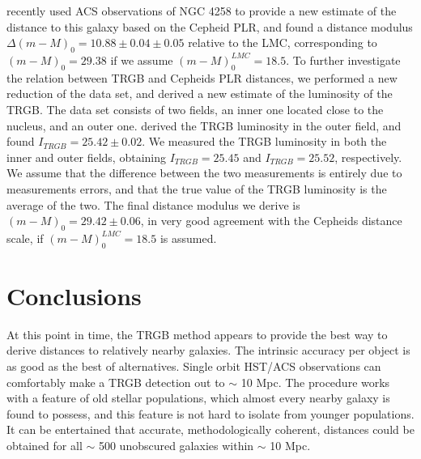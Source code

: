 \documentclass[11pt,preprint2]{aastex}
\begin{document}
\cite{2006astro.ph..8211M} recently used ACS observations of NGC 4258 to provide a new estimate of the distance to this galaxy based on the Cepheid PLR, and found a distance modulus $\Delta(m-M)_0=10.88 \pm 0.04 \pm 0.05$ relative to the LMC, corresponding to $(m-M)_0=29.38$ if we assume $(m-M)_0^{LMC}=18.5$. To further investigate the relation between TRGB and Cepheids PLR distances, we performed a new reduction of the \cite{2006astro.ph..8211M} data set, and derived a new estimate of the luminosity of the TRGB. The data set consists of two fields, an inner one located close to the nucleus, and an outer one. \cite{2006astro.ph..8211M} derived the TRGB luminosity in the outer field, and found $I_{TRGB}=25.42 \pm 0.02$.  We measured the TRGB luminosity in both the inner and outer fields, obtaining $I_{TRGB}=25.45$ and $I_{TRGB}=25.52$, respectively. We assume that the difference between the two measurements is entirely due to measurements errors, and that the true value of the TRGB luminosity is the average of the two. The final distance modulus we derive is $(m-M)_0=29.42 \pm 0.06$, in very good agreement with the Cepheids distance scale, if $(m-M)_0^{LMC}=18.5$ is assumed.




\section{Conclusions}
At this point in time, the TRGB method appears to provide the best way to derive distances to relatively nearby galaxies. The intrinsic accuracy per object is as good as the best of alternatives. Single orbit HST/ACS observations can comfortably make a TRGB detection out to $\sim$ 10 Mpc. The procedure works with a feature of old stellar populations, which almost every nearby galaxy is found to possess, and this feature is not hard to isolate from younger populations. It can be entertained that accurate, methodologically coherent, distances could be obtained for all $\sim$ 500 unobscured galaxies within $\sim$ 10 Mpc.
\end{document}
